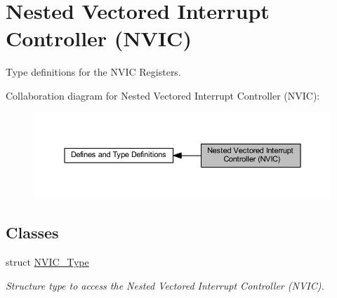 \hypertarget{group___c_m_s_i_s___n_v_i_c}{}\section{Nested Vectored Interrupt Controller (N\+V\+IC)}
\label{group___c_m_s_i_s___n_v_i_c}


Type definitions for the N\+V\+IC Registers.  


Collaboration diagram for Nested Vectored Interrupt Controller (N\+V\+IC)\+:
\nopagebreak
\begin{figure}[H]
\begin{center}
\leavevmode
\includegraphics[width=350pt]{group___c_m_s_i_s___n_v_i_c}
\end{center}
\end{figure}
\subsection*{Classes}
\begin{DoxyCompactItemize}
\item 
struct \hyperlink{struct_n_v_i_c___type}{N\+V\+I\+C\+\_\+\+Type}
\begin{DoxyCompactList}\small\item\em Structure type to access the Nested Vectored Interrupt Controller (N\+V\+IC). \end{DoxyCompactList}\end{DoxyCompactItemize}
